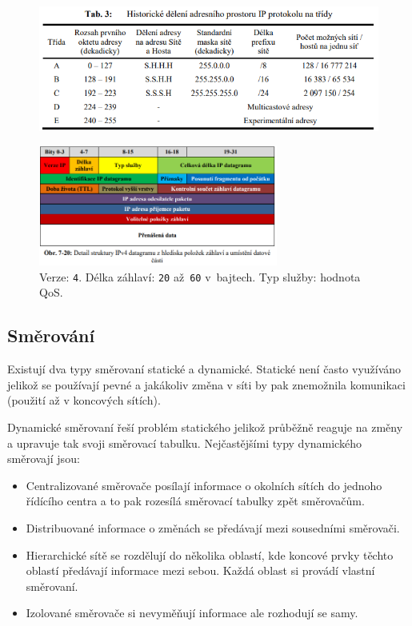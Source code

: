 \clearpage
\begin{figure}
	\centering
	\includegraphics[width=\textwidth]{images/q07_ip_classes}
\end{figure}

\begin{figure}
	\centering
	\includegraphics[width=0.7\textwidth]{images/q07_ip_packet}
	\caption*{Verze: \texttt{4}. Délka záhlaví: \texttt{20} až~\texttt{60} v~bajtech. Typ služby: hodnota QoS. }
\end{figure}

\subsection{Směrování}

Existují dva typy směrovaní statické a dynamické. Statické není často využíváno jelikož se používají pevné a jakákoliv změna v síti by pak znemožnila komunikaci (použití až v koncových sítích). 

Dynamické směrovaní řeší problém statického jelikož průběžně reaguje na změny a upravuje tak svoji směrovací tabulku. Nejčastějšími typy dynamického směrovají jsou:

\begin{itemize}[noitemsep]
    \item Centralizované směrovače posílají informace o okolních sítích do jednoho řídícího centra a to pak rozesílá směrovací tabulky zpět směrovačům.
    \item Distribuované informace o změnách se předávají mezi sousedními směrovači. 
    \item Hierarchické sítě se rozdělují do několika oblastí, kde koncové prvky těchto oblastí předávají informace mezi sebou. Každá oblast si provádí vlastní směrovaní.
    \item Izolované směrovače si nevyměňují informace ale rozhodují se samy.
\end{itemize}

